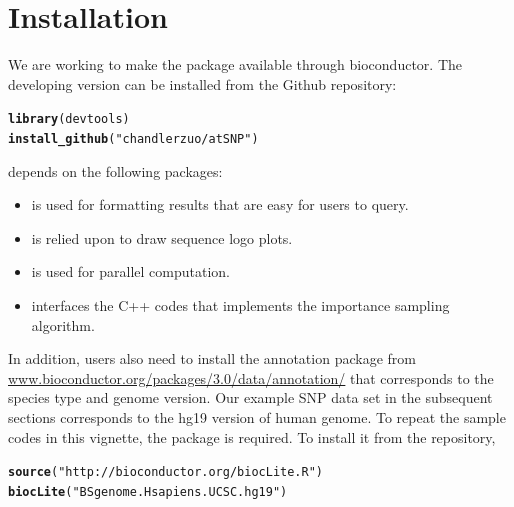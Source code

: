 \documentclass[a4paper,10pt]{article}\usepackage[]{graphicx}\usepackage[]{color}
\makeatletter
\newcommand{\hlstr}[1]{\textcolor[rgb]{0.192,0.494,0.8}{#1}}%
\newcommand{\hlstd}[1]{\textcolor[rgb]{0.345,0.345,0.345}{#1}}%
\newcommand{\hlkwd}[1]{\textcolor[rgb]{0.737,0.353,0.396}{\textbf{#1}}}%
\newenvironment{kframe}{%
 \def\at@end@of@kframe{}%
 \ifinner\ifhmode%
  \def\at@end@of@kframe{\end{minipage}}%
  \begin{minipage}{\columnwidth}%
 \fi\fi%
 \def\FrameCommand##1{\hskip\@totalleftmargin \hskip-\fboxsep
 \colorbox{shadecolor}{##1}\hskip-\fboxsep
     \hskip-\linewidth \hskip-\@totalleftmargin \hskip\columnwidth}%
 \MakeFramed {\advance\hsize-\width
   \@totalleftmargin\z@ \linewidth\hsize
   \@setminipage}}%
 {\par\unskip\endMakeFramed%
 \at@end@of@kframe}
\newenvironment{knitrout}{}{} %
\makeatother
\begin{document}
\section{Installation}

We are working to make the package available through bioconductor. The developing version can be installed from the Github repository:

\begin{knitrout}
\color{fgcolor}\begin{kframe}
\begin{alltt}
\hlkwd{library}\hlstd{(devtools)}
\hlkwd{install_github}\hlstd{(}\hlstr{"chandlerzuo/atSNP"}\hlstd{)}
\end{alltt}
\end{kframe}
\end{knitrout}

 depends on the following \R{} packages:

\begin{itemize}
\item {} is used for formatting results that are easy for users to query.
\item {} is relied upon to draw sequence logo plots.
\item {} is used for parallel computation.
\item {} interfaces the C++ codes that implements the importance sampling algorithm.
\end{itemize}
  
In addition, users also need to install the annotation package from \url{www.bioconductor.org/packages/3.0/data/annotation/} that corresponds to the species type and genome version. Our example SNP data set in the subsequent sections corresponds to the hg19 version of human genome. To repeat the sample codes in this vignette, the  package is required. To install it from the \Bioconductor{} repository,


\begin{knitrout}
\color{fgcolor}\begin{kframe}
\begin{alltt}
  \hlkwd{source}\hlstd{(}\hlstr{"http://bioconductor.org/biocLite.R"}\hlstd{)}
  \hlkwd{biocLite}\hlstd{(}\hlstr{"BSgenome.Hsapiens.UCSC.hg19"}\hlstd{)}
\end{alltt}
\end{kframe}
\end{knitrout}
\end{document}
